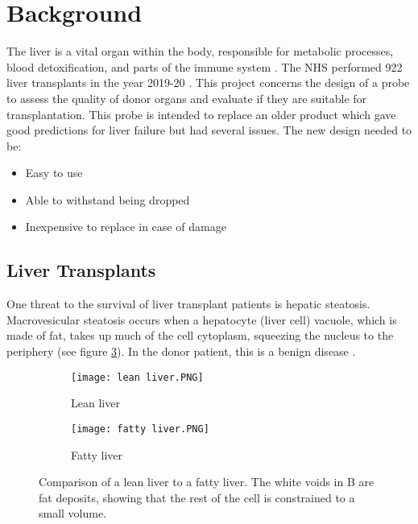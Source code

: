 \section{Background}

The liver is a vital organ within the body, responsible for metabolic processes, blood detoxification, and parts of the immune system \cite{liver_background}. The NHS performed 922 liver transplants in the year 2019-20 \cite{nhs_transplants}. This project concerns the design of a probe to assess the quality of donor organs and evaluate if they are suitable for transplantation. This probe is intended to replace an older product which gave good predictions for liver failure but had several issues. The new design needed to be:

\begin{itemize}[noitemsep, nolistsep]
\item Easy to use
\item Able to withstand being dropped
\item Inexpensive to replace in case of damage
\end{itemize}


\subsection{Liver Transplants}
One threat to the survival of liver transplant patients is hepatic steatosis. Macrovesicular steatosis occurs when a hepatocyte (liver cell) vacuole, which is made of fat, takes up much of the cell cytoplasm, squeezing the nucleus to the periphery (see figure \ref{fig: livers}). In the donor patient, this is a benign disease \cite{Imber2002}.\\

\begin{figure}[htb]
	\centering
	\begin{subfigure}[b]{0.4\linewidth}
		\texttt{[image: lean liver.PNG]}
		\caption{Lean liver \cite{Bruno2008}}
		\label{}
	\end{subfigure}
	\begin{subfigure}[b]{0.4\linewidth}
		\texttt{[image: fatty liver.PNG]}
		\caption{Fatty liver \cite{Bruno2008}}
		\label{fig: fatty liver}
	\end{subfigure}
	\caption{Comparison of a lean liver to a fatty liver. The white voids in B are fat deposits, showing that the rest of the cell is constrained to a small volume.}
	\label{fig: livers}
\end{figure}	


